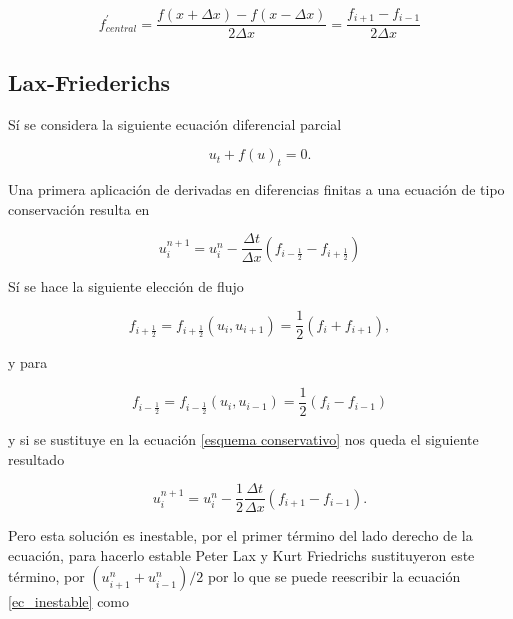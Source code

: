 \documentclass[12pt,a4paper]{book}
\begin{document}
\begin{equation} \label{Centrada}
f_{central}^{'}=\frac{f\left(x + \Delta x\right) - f(x - \Delta x) }{2\Delta x}=\frac{f_{i+1}-f_{i-1}}{2 \Delta x}
\end{equation}



\subsection{Lax-Friederichs}

Sí se considera la siguiente ecuación diferencial parcial \citep{Duchateau2002}

\begin{equation} \label{ecu_conser}
u_t+ f\left(u \right)_t=0.
\end{equation}

\noindent Una primera aplicación de derivadas en diferencias finitas a una ecuación de tipo conservación resulta en 

\begin{equation}\label{esquema conservativo}
u_i^{n+1} = u_i^{n} -\frac{\Delta t}{\Delta x} \left(f_{i-\frac{1}{2}} - f_{i+\frac{1}{2}}\right)
\end{equation}



\noindent Sí se hace la siguiente elección de flujo 

\begin{equation}
f_{i+\frac{1}{2}} = f_{i+\frac{1}{2}} \left(
u_{i} , u_{i+1}\right) =\frac{1}{2} \left(f_{i} + f_{i+1} \right), 
\end{equation}

\noindent y para 

\begin{equation}
f_{i-\frac{1}{2}} = f_{i-\frac{1}{2}} \left(
u_{i} , u_{i-1}\right) =\frac{1}{2} \left(f_{i} - f_{i-1} \right) 
\end{equation}

\noindent y si se sustituye en la ecuación \ref{esquema conservativo} nos queda el siguiente resultado

\begin{equation}\label{ec_inestable}
u_i^{n+1} = u_i^{n} - \frac{1}{2}\frac{\Delta t}{\Delta x} \left(f_{i+1} - f_{i-1} \right).
\end{equation}

\noindent Pero esta solución es inestable, por el primer término del lado derecho de la ecuación, para hacerlo estable Peter Lax y Kurt Friedrichs sustituyeron este término, por $(u_{i+1}^n+u_{i-1}^n)/2$  por lo que se puede
reescribir la ecuación \ref{ec_inestable} como
\end{document}
